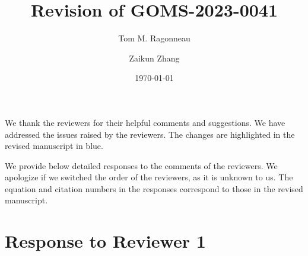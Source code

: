\documentclass{article}
\title{Revision of GOMS-2023-0041}
\author{Tom M. Ragonneau \and Zaikun Zhang}
\date{\today}
\begin{document}
\maketitle

We thank the reviewers for their helpful comments and suggestions.
We have addressed the issues raised by the reviewers.
The changes are highlighted in the revised manuscript in blue.

We provide below detailed responses to the comments of the reviewers.
We apologize if we switched the order of the reviewers, as it is unknown to us.
The equation and citation numbers in the responses correspond to those in the revised manuscript.

\section{Response to Reviewer 1}
\end{document}
